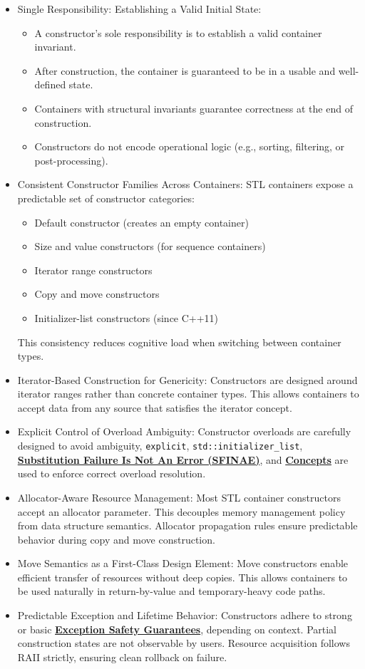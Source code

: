 \documentclass[a4paper,12pt]{article}
\begin{document}
\begin{itemize}
\item Single Responsibility: Establishing a Valid Initial State:
\begin{itemize}
\item A constructor's sole responsibility is to establish a valid container invariant.
\item After construction, the container is guaranteed to be in a usable and well-defined state.
\item Containers with structural invariants guarantee correctness at the end of construction.
\item Constructors do not encode operational logic (e.g., sorting, filtering, or post-processing).
\end{itemize}
\item Consistent Constructor Families Across Containers: STL containers expose a predictable set of constructor categories:
\begin{itemize}
\item Default constructor (creates an empty container)
\item Size and value constructors (for sequence containers)
\item Iterator range constructors
\item Copy and move constructors
\item Initializer-list constructors (since C++11)
\end{itemize}
This consistency reduces cognitive load when switching between container types.
\item Iterator-Based Construction for Genericity: Constructors are designed around iterator ranges rather than concrete container types. This allows containers to accept data from any source that satisfies the iterator concept.
\item Explicit Control of Overload Ambiguity: Constructor overloads are carefully designed to avoid ambiguity, \verb|explicit|, \verb|std::initializer_list|, \hyperref[sfinae]{\textbf{Substitution Failure Is Not An Error (SFINAE)}}, and \hyperref[concepts]{\textbf{Concepts}} are used to enforce correct overload resolution.
\item Allocator-Aware Resource Management: Most STL container constructors accept an allocator parameter. This decouples memory management policy from data structure semantics. Allocator propagation rules ensure predictable behavior during copy and move construction.
\item Move Semantics as a First-Class Design Element: Move constructors enable efficient transfer of resources without deep copies. This allows containers to be used naturally in return-by-value and temporary-heavy code paths.
\item Predictable Exception and Lifetime Behavior: Constructors adhere to strong or basic \hyperref[exception]{\textbf{Exception Safety Guarantees}}, depending on context. Partial construction states are not observable by users. Resource acquisition follows RAII strictly, ensuring clean rollback on failure.
\end{itemize}
\end{document}
